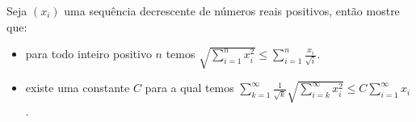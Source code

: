 Seja \((x_i)\) uma sequência decrescente de números reais positivos, então mostre que:
\begin{itemize}

\item[(a)] para todo inteiro positivo \(n\) temos \(\sqrt{\sum^n_{i=1}{x_i^2}} \leq \sum^n_{i=1}\frac{x_i}{\sqrt{i}}\).

\item[(b)] existe uma constante \(C\) para a qual temos \(\sum^{\infty}_{k=1}\frac{1}{\sqrt{k}}\sqrt{\sum^{\infty}_{i=k}x_i^2} \le C\sum^{\infty}_{i=1}x_i\).
\end{itemize}
